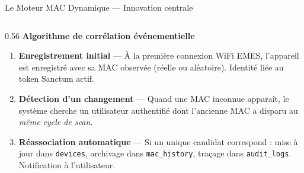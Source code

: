 \documentclass[aspectratio=169, 10pt]{beamer}
\begin{document}
\begin{frame}{Le Moteur MAC Dynamique --- Innovation centrale}
  \begin{columns}[T]
    \begin{column}{0.56\textwidth}
      \textbf{\textcolor{EMESblue}{\small Algorithme de corrélation événementielle}}
      \vspace{0.25cm}

      \begin{enumerate}\setlength\itemsep{6pt}
        \item \textbf{Enregistrement initial} ---
          À la première connexion WiFi EMES, l'appareil est enregistré avec sa MAC observée (réelle ou aléatoire). Identité liée au token Sanctum actif.

        \item \textbf{Détection d'un changement} ---
          Quand une MAC inconnue apparaît, le système cherche un utilisateur authentifié dont l'ancienne MAC a disparu au \textit{même cycle de scan}.

        \item \textbf{Réassociation automatique} ---
          Si un unique candidat correspond : mise à jour dans \texttt{devices}, archivage dans \texttt{mac\_history}, traçage dans \texttt{audit\_logs}. Notification à l'utilisateur.


\end{enumerate}
\end{column}
\end{columns}
\end{frame}
\end{document}

